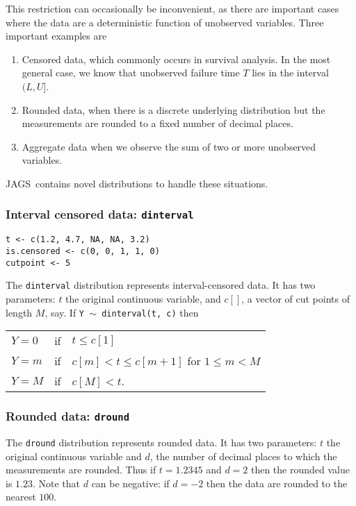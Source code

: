 \documentclass[11pt, a4paper, titlepage]{report}
\newcommand{\JAGS}{\textsf{JAGS}}
\begin{document}
This restriction can occasionally be inconvenient, as there are
important cases where the data are a deterministic function of
unobserved variables.  Three important examples are
\begin{enumerate}
\item Censored data, which commonly occurs in survival analysis. In
the most general case, we know that unobserved failure time $T$
lies in the interval $(L,U]$.
\item Rounded data, when there is a discrete underlying distribution
but the measurements are rounded to a fixed number of decimal places.
\item Aggregate data when we observe the sum of two or more
unobserved variables.
\end{enumerate}
\JAGS\ contains novel distributions to handle these situations.  

\subsubsection{Interval censored data: \texttt{dinterval}}

\begin{verbatim}
t <- c(1.2, 4.7, NA, NA, 3.2)
is.censored <- c(0, 0, 1, 1, 0)
cutpoint <- 5
\end{verbatim}

The \texttt{dinterval} distribution represents interval-censored
data. It has two parameters: $t$ the original continuous variable, and
$c[]$, a vector of cut points of length $M$, say. If \texttt{Y $\sim$
  dinterval(t, c)} then

\begin{tabular}{lll}
$Y=0$   & if & $t \leq c[1]$\\
$Y=m$   & if & $c[m] < t \leq c[m+1]$ for $1 \leq m < M$\\
$Y = M$ & if & $c[M] < t$.
\end{tabular}

\subsubsection{Rounded data: \texttt{dround}}

The \texttt{dround} distribution represents rounded data. It has two
parameters: $t$ the original continuous variable and $d$, the number
of decimal places to which the measurements are rounded. Thus if
$t=1.2345$ and $d=2$ then the rounded value is $1.23$. Note that $d$
can be negative: if $d=-2$ then the data are rounded to the nearest
$100$.
\end{document}

